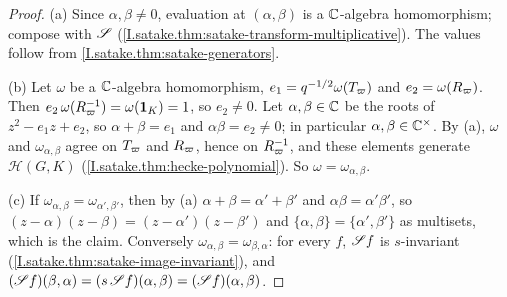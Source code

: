 \begin{theorem}
\end{theorem}
\begin{proof}
(a) Since $\alpha,\beta\neq0$, evaluation at $(\alpha,\beta)$ is a $\mathbb{C}$-algebra homomorphism; compose with $\mathscr{S}$
(\cref{I.satake.thm:satake-transform-multiplicative}). The values follow from \cref{I.satake.thm:satake-generators}.

(b) Let $\omega$ be a $\mathbb{C}$-algebra homomorphism, $e_1=q^{-1/2}\omega(T_\varpi)$ and $e_2=\omega(R_\varpi)$. Then
$e_2\,\omega(R_\varpi^{-1})=\omega(\mathbf 1_K)=1$, so $e_2\neq0$. Let $\alpha,\beta\in\mathbb{C}$ be the roots of
$z^2-e_1z+e_2$, so $\alpha+\beta=e_1$ and $\alpha\beta=e_2\neq0$; in particular $\alpha,\beta\in\mathbb{C}^\times$. By (a),
$\omega$ and $\omega_{\alpha,\beta}$ agree on $T_\varpi$ and $R_\varpi$, hence on $R_\varpi^{-1}$, and these elements generate
$\mathcal H(G,K)$ (\cref{I.satake.thm:hecke-polynomial}). So $\omega=\omega_{\alpha,\beta}$.

(c) If $\omega_{\alpha,\beta}=\omega_{\alpha',\beta'}$, then by (a) $\alpha+\beta=\alpha'+\beta'$ and $\alpha\beta=\alpha'\beta'$,
so $(z-\alpha)(z-\beta)=(z-\alpha')(z-\beta')$ and $\{\alpha,\beta\}=\{\alpha',\beta'\}$ as multisets, which is the claim.
Conversely $\omega_{\alpha,\beta}=\omega_{\beta,\alpha}$: for every $f$, $\mathscr{S} f$ is $s$-invariant
(\cref{I.satake.thm:satake-image-invariant}), and $(\mathscr{S} f)(\beta,\alpha)=(s\,\mathscr{S} f)(\alpha,\beta)=(\mathscr{S} f)(\alpha,\beta)$.
\end{proof}
